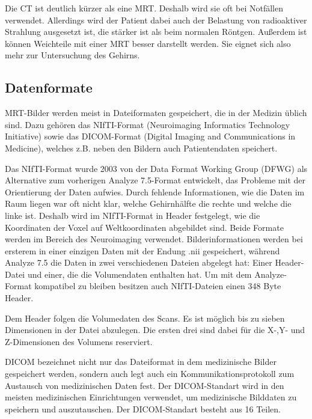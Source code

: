 Die CT ist deutlich kürzer als eine MRT. Deshalb wird sie oft bei Notfällen verwendet. Allerdings wird der Patient dabei auch der Belastung von radioaktiver Strahlung ausgesetzt ist, die stärker ist als beim normalen Röntgen. Außerdem ist können Weichteile mit einer MRT besser darstellt werden. Sie eignet sich also mehr zur Untersuchung des Gehirns.


\subsection{Datenformate}

MRT-Bilder werden meist in Dateiformaten gespeichert, die in der Medizin üblich sind. Dazu gehören das NIfTI-Format (Neuroimaging Informatics Technology Initiative) sowie das DICOM-Format (Digital Imaging and Communications in Medicine), welches z.B. neben den Bildern auch Patientendaten speichert.

Das NIfTI-Format wurde 2003 von der Data Format Working Group (DFWG) als Alternative zum vorherigen Analyze 7.5-Format entwickelt, das Probleme mit der Orientierung der Daten aufwies. Durch fehlende Informationen, wie die Daten im Raum liegen war oft nicht klar, welche Gehirnhälfte die rechte und welche die linke ist. Deshalb wird im NIfTI-Format in Header festgelegt, wie die Koordinaten der Voxel auf Weltkoordinaten abgebildet sind. Beide Formate werden im Bereich des Neuroimaging verwendet.
Bilderinformationen werden bei ersterem in einer einzigen Daten mit der Endung .nii gespeichert, während Analyze 7.5 die Daten in zwei verschiedenen Dateien abgelegt hat: Einer Header-Datei und einer, die die Volumendaten enthalten hat. Um mit dem Analyze-Format kompatibel zu bleiben besitzen auch NIfTI-Dateien einen 348 Byte Header.
 
Dem Header folgen die Volumedaten des Scans. Es ist möglich bis zu sieben Dimensionen in der Datei abzulegen. Die ersten drei sind dabei für die X-,Y- und Z-Dimensionen des Volumens reserviert.

DICOM bezeichnet nicht nur das Dateiformat in dem medizinische Bilder gespeichert werden, sondern auch legt auch ein Kommunikationsprotokoll zum Austausch von medizinischen Daten fest. Der DICOM-Standart wird in den meisten medizinischen Einrichtungen verwendet, um medizinische Bilddaten zu speichern und auszutauschen.
Der DICOM-Standart besteht aus 16 Teilen.

